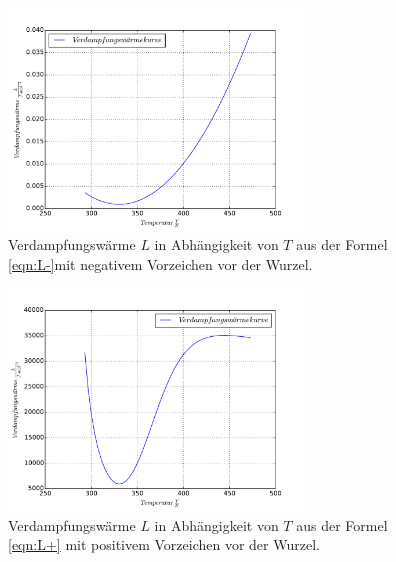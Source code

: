 \begin{figure}
  \centering
  \includegraphics[width=0.7\textwidth]{plot3.pdf}
  \caption{Verdampfungswärme $L$ in Abhängigkeit von $T$ aus der Formel \eqref{eqn:L-}mit negativem Vorzeichen vor der Wurzel.}
  \label{abb:-}
\end{figure}

\begin{figure}
  \centering
  \includegraphics[width=0.7\textwidth]{plot4.pdf}
  \caption{Verdampfungswärme $L$ in Abhängigkeit von $T$ aus der Formel \eqref{eqn:L+} mit positivem Vorzeichen vor der Wurzel.}
  \label{abb:+}
\end{figure}
